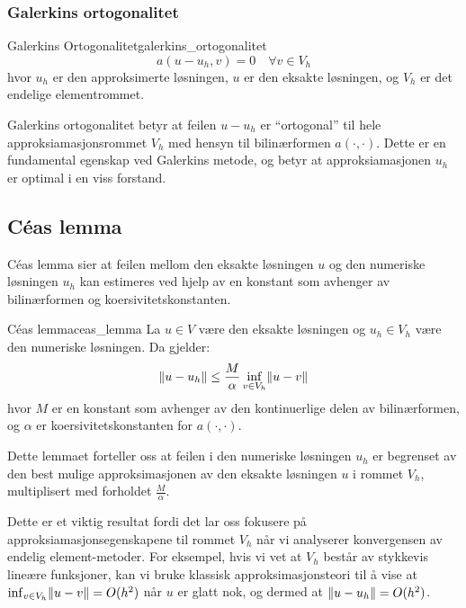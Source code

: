 \subsubsection{Galerkins ortogonalitet}

\begin{definition}{Galerkins Ortogonalitet}{galerkins_ortogonalitet}
	\[
		a(u - u_h, v) = 0 \quad \forall v \in V_h
	\]
	hvor $u_h$ er den approksimerte løsningen, $u$ er den eksakte løsningen, og $V_h$ er det endelige elementrommet.
\end{definition}

Galerkins ortogonalitet betyr at feilen $u - u_h$ er \enquote{ortogonal} til hele approksiamasjonsrommet $V_h$ med hensyn til bilinærformen $a(\cdot,\cdot)$. Dette er en fundamental egenskap ved Galerkins metode, og betyr at approksiamasjonen $u_h$ er optimal i en viss forstand.

\subsection{Céas lemma}
Céas lemma sier at feilen mellom den eksakte løsningen $u$ og den numeriske løsningen $u_h$ kan estimeres ved hjelp av en konstant som avhenger av bilinærformen og koersivitetskonstanten.

\begin{lemma}{Céas lemma}{ceas_lemma}
	La $u \in V$ være den eksakte løsningen og $u_h \in V_h$ være den numeriske løsningen. Da gjelder:
	\[
		\norm*{u - u_h} \leq \frac{M}{\alpha} \inf_{v \in V_h} \norm*{u - v}
	\]
	hvor $M$ er en konstant som avhenger av den kontinuerlige delen av bilinærformen, og $\alpha$ er koersivitetskonstanten for $a(\cdot,\cdot)$.
\end{lemma}

Dette lemmaet forteller oss at feilen i den numeriske løsningen $u_h$ er begrenset av den best mulige approksimasjonen av den eksakte løsningen $u$ i rommet $V_h$, multiplisert med forholdet $\frac{M}{\alpha}$.

Dette er et viktig resultat fordi det lar oss fokusere på approksiamasjonsegenskapene til rommet $V_h$ når vi analyserer konvergensen av endelig element-metoder. For eksempel, hvis vi vet at $V_h$ består av stykkevis lineære funksjoner, kan vi bruke klassisk approksimasjonsteori til å vise at $\inf_{v \in V_h} \norm*{u - v} = O(h^2)$ når $u$ er glatt nok, og dermed at $\norm*{u - u_h} = O(h^2)$.


